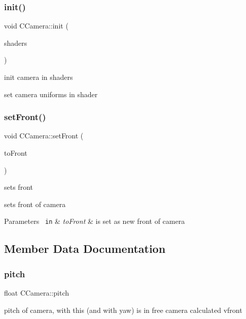 \subsubsection{\texorpdfstring{init()}{init()}}
{\footnotesize\ttfamily void C\+Camera\+::init (\begin{DoxyParamCaption}\item[{G\+Luint}]{shaders }\end{DoxyParamCaption})}



init camera in shaders 

set camera uniforms in shader \mbox{\label{class_c_camera_aecabdd595f7051f0780374f8970279ee}} 
\subsubsection{\texorpdfstring{setFront()}{setFront()}}
{\footnotesize\ttfamily void C\+Camera\+::set\+Front (\begin{DoxyParamCaption}\item[{const glm\+::vec3 \&}]{to\+Front }\end{DoxyParamCaption})}



sets front 

sets front of camera 
\begin{DoxyParams}[1]{Parameters}
\mbox{\texttt{ in}}  & {\em to\+Front} & is set as new front of camera \\
\hline
\end{DoxyParams}


\subsection{Member Data Documentation}
\mbox{\label{class_c_camera_aecb3cfc8655a1891fa67c037b34d7c8a}} 
\subsubsection{\texorpdfstring{pitch}{pitch}}
{\footnotesize\ttfamily float C\+Camera\+::pitch}



pitch of camera, with this (and with yaw) is in free camera calculated vfront 


